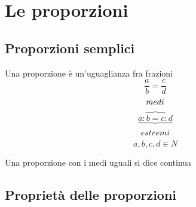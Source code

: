 \chapter{Le proporzioni}
\label{sec:LeProporzioni}
\minitoc%
\section{Proporzioni semplici}
\label{sec:ProporzioniSemplici}


Una proporzione è un'uguaglianza fra frazioni
\[\dfrac{a}{b}=\dfrac{c}{d}\]
\[medi\index{Proporzione!medi}\]
\[{\underbrace{a:\overbrace{b=c}:d}}\]
\[estremi\index{Proporzione!estremi}\]
\[a,b,c,d\in N\]

Una proporzione con i medi uguali si dice continua

\section{Proprietà delle proporzioni}
\label{sec:ProprietaDelleProporzioni}
